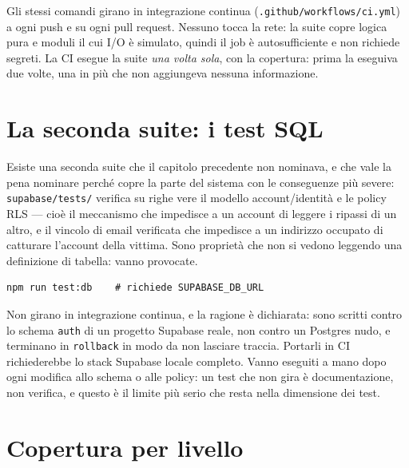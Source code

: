 \documentclass[11pt,a4paper]{report}
\begin{document}
Gli stessi comandi girano in integrazione continua
(\texttt{.github/workflows/ci.yml}) a ogni push e su ogni pull request. Nessuno
tocca la rete: la suite copre logica pura e moduli il cui I/O \`e simulato,
quindi il job \`e autosufficiente e non richiede segreti. La CI esegue la
suite \emph{una volta sola}, con la copertura: prima la eseguiva due volte,
una in pi\`u che non aggiungeva nessuna informazione.

\section{La seconda suite: i test SQL}

Esiste una seconda suite che il capitolo precedente non nominava, e che vale
la pena nominare perch\'e copre la parte del sistema con le conseguenze pi\`u
severe: \texttt{supabase/tests/} verifica su righe vere il modello
account/identit\`a e le policy RLS --- cio\`e il meccanismo che impedisce a un
account di leggere i ripassi di un altro, e il vincolo di email verificata che
impedisce a un indirizzo occupato di catturare l'account della vittima. Sono
propriet\`a che non si vedono leggendo una definizione di tabella: vanno
provocate.

\begin{lstlisting}
npm run test:db    # richiede SUPABASE_DB_URL
\end{lstlisting}

Non girano in integrazione continua, e la ragione \`e dichiarata: sono scritti
contro lo schema \texttt{auth} di un progetto Supabase reale, non contro un
Postgres nudo, e terminano in \texttt{rollback} in modo da non lasciare
traccia. Portarli in CI richiederebbe lo stack Supabase locale completo. Vanno
eseguiti a mano dopo ogni modifica allo schema o alle policy: un test che non
gira \`e documentazione, non verifica, e questo \`e il limite pi\`u serio che
resta nella dimensione dei test.

\section{Copertura per livello}
\end{document}
